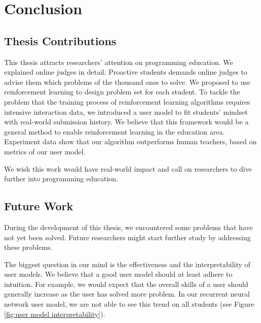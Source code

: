 
\chapter{Conclusion}

\section{Thesis Contributions}

    This thesis attracts researchers' attention on programming education.
    We explained online judges in detail.
    Proactive students demands online judges to advise them which problems of the thousand ones to solve.
    We proposed to use reinforcement learning to design problem set for each student.
    To tackle the problem that the training process of reinforcement learning algorithms
    requires intensive interaction data,
    we introduced a user model to fit students' mindset with real-world submission history.
    We believe that this framework would be a general method to enable reinforcement learning in the education area.
    Experiment data show that our algorithm outperforms human teachers,
    based on metrics of our user model.

    We wish this work would have real-world impact and call on researchers to dive further into programming education.

\section{Future Work}

    During the development of this thesis, we encountered some problems that have not yet been solved.
    Future researchers might start further study by addressing these problems.

    The biggest question in our mind is the effectiveness and the interpretability of user models.
    We believe that a good user model should at least adhere to intuition.
    For example, we would expect that the overall skills of a user should generally increase
    as the user has solved more problem.
    In our recurrent neural network user model, we are not able to see this trend on all students
    (see Figure \ref{fig:user model interpretability}).

